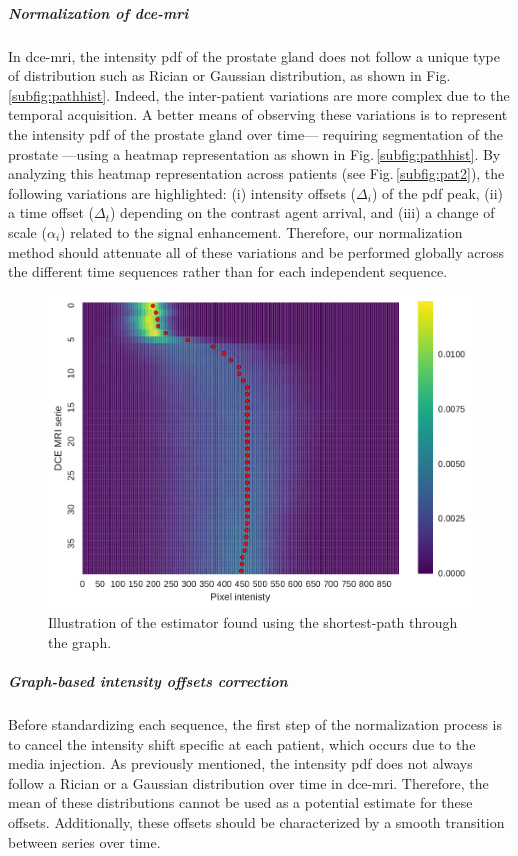 \documentclass[a4paper,num-refs]{wiley-article}
\begin{document}
\subparagraph{Normalization of \ac{dce}-\ac{mri}} In \ac{dce}-\ac{mri}, the
intensity \ac{pdf} of the prostate gland does not follow a unique type of
distribution such as Rician or Gaussian distribution, as shown in
Fig.\,\ref{subfig:pathhist}. Indeed, the inter-patient variations are more
complex due to the temporal acquisition. A better means of observing these
variations is to represent the intensity \ac{pdf} of the prostate gland over
time--- requiring segmentation of the prostate ---using a heatmap
representation as shown in Fig.\,\ref{subfig:pathhist}. By analyzing this
heatmap representation across patients (see Fig.\,\ref{subfig:pat2}), the
following variations are highlighted: (i) intensity offsets ($\Delta_i$) of the
\ac{pdf} peak, (ii) a time offset ($\Delta_t$) depending on the contrast agent
arrival, and (iii) a change of scale ($\alpha_i$) related to the signal
enhancement. Therefore, our normalization method should attenuate all of these
variations and be performed globally across the different time sequences rather
than for each independent sequence.

\begin{figure}
  \centering
  \includegraphics[width=0.45\linewidth]{images/DCE-normalization/estimator.pdf}
  \caption{Illustration of the estimator found using the shortest-path through
    the graph.}
  \label{fig:estimator}
\end{figure}

\subparagraph{Graph-based intensity offsets correction} Before standardizing
each sequence, the first step of the normalization process is to cancel the
intensity shift specific at each patient, which occurs due to the media
injection. As previously mentioned, the intensity \ac{pdf} does not always
follow a Rician or a Gaussian distribution over time in
\ac{dce}-\ac{mri}. Therefore, the mean of these distributions cannot be used as
a potential estimate for these offsets. Additionally, these offsets should be
characterized by a smooth transition between series over time.
\end{document}
